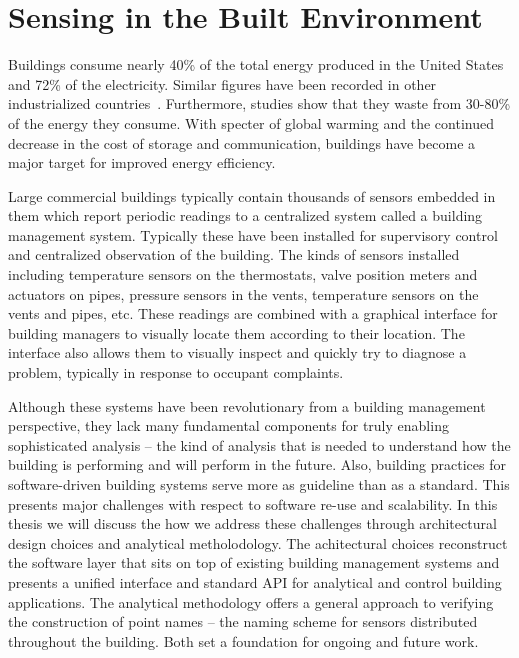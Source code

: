 \chapter{Sensing in the Built Environment}

Buildings consume nearly 40\% of the total energy produced in the United States and 72\% of the electricity.  Similar figures 
have been recorded in other industrialized countries~\cite{buildings_study}.  Furthermore, studies show that they waste from
30-80\% of the energy they consume.  With specter of global warming and the continued decrease in the cost of storage and 
communication, buildings have become a major target for improved energy efficiency.

Large commercial buildings typically contain thousands of sensors embedded in them which report periodic readings to 
a centralized system called a building management system.  Typically these have been installed for supervisory control and
centralized observation of the building.  The kinds of sensors installed including temperature sensors on the thermostats,
valve position meters and actuators on pipes, pressure sensors in the vents, temperature sensors on the vents and pipes, etc.
These readings are combined with a graphical interface for building managers to visually locate them according to their location.
The interface also allows them to visually inspect and quickly try to diagnose a problem, typically in response to occupant
complaints.

Although these systems have been revolutionary from a building management perspective, they lack many fundamental components for
truly enabling sophisticated analysis -- the kind of analysis that is needed to understand how the building is performing
and will perform in the future.  Also, building practices for software-driven building systems serve more as guideline than
 as a standard.  This presents major challenges with respect to software re-use and scalability.  In this thesis
we will discuss the how we address these challenges through architectural design choices and analytical metholodology.  
The achitectural choices reconstruct the software layer that sits on top of existing building management systems and presents
a unified interface and standard API for analytical and control building applications.
The analytical methodology offers a general approach to verifying the construction of point names -- the naming scheme for 
sensors distributed throughout the building.  Both set a foundation for ongoing and future work.


